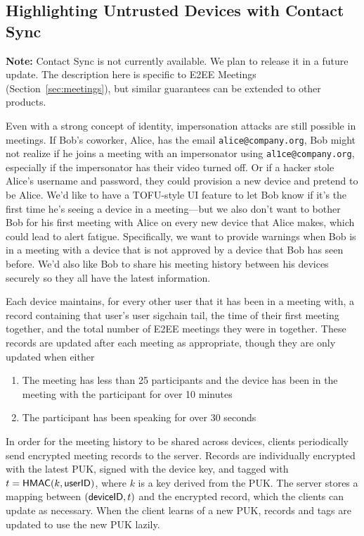 \subsection{Highlighting Untrusted Devices with Contact Sync}
\label{subsec:contactsync}

\textbf{Note:} Contact Sync is not currently available. We plan to release it in a future update.
The description here is specific to E2EE Meetings (Section~\ref{sec:meetings}), but similar
guarantees can be extended to other products. 

Even with a strong concept of identity, impersonation attacks are still possible in meetings. If
Bob's coworker, Alice, has the email \texttt{alice@company.org}, Bob might not realize if he joins a
meeting with an impersonator using \texttt{al1ce@company.org}, especially if the impersonator has
their video turned off. Or if a hacker stole Alice's username and password, they could provision a
new device and pretend to be Alice. We'd like to have a TOFU-style UI feature to let Bob know if
it's the first time he's seeing a device in a meeting---but we also don't want to bother Bob for his
first meeting with Alice on every new device that Alice makes, which could lead to alert fatigue.
Specifically, we want to provide warnings when Bob is in a meeting with a device that is not
approved by a device that Bob has seen before. We'd also like Bob to share his meeting history
between his devices securely so they all have the latest information.

Each device maintains, for every other user that it has been in a meeting with, a record containing
that user's user sigchain tail, the time of their first meeting together, and the total number of
E2EE meetings they were in together. These records are updated after each meeting as appropriate,
though they are only updated when either
\begin{enumerate}
\item The meeting has less than 25 participants and the device has been in the meeting with the
participant for over 10 minutes
\item The participant has been speaking for over 30 seconds
\end{enumerate}

In order for the meeting history to be shared across devices, clients periodically send encrypted
meeting records to the server. Records are individually encrypted with the latest PUK, signed with
the device key, and tagged with $t = \mathsf{HMAC}(k, \mathsf{userID})$, where $k$ is a key derived from the
PUK. The server stores a mapping between $({\sf deviceID}, t)$ and the encrypted record, which the
clients can update as necessary. When the client learns of a new PUK, records and tags are updated
to use the new PUK lazily.

